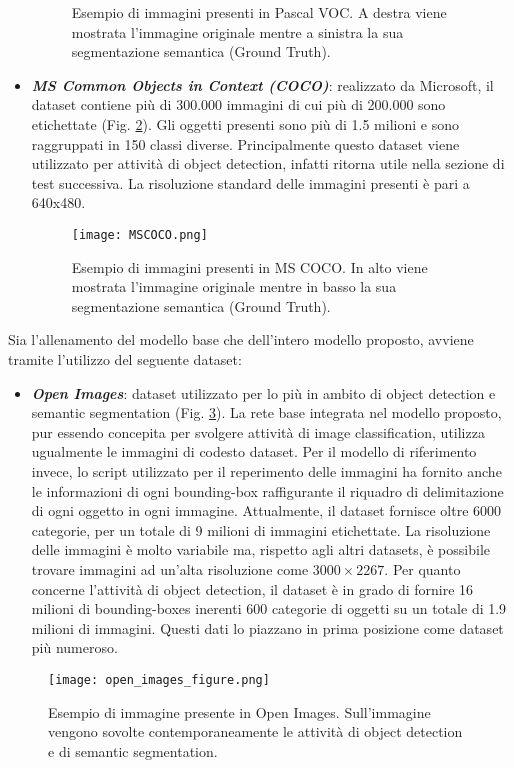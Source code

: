 \begin{itemize}
\begin{figure}
        \caption{Esempio di immagini presenti in Pascal VOC. A destra viene mostrata l'immagine originale mentre a sinistra la sua segmentazione semantica (Ground Truth).}
        \label{pascal}
    \end{figure} 
    \item {\bfseries{\emph{MS Common Objects in Context (COCO)}}}\cite{COCO}: realizzato da 
    Microsoft, il dataset contiene più di 300.000 immagini di cui più di 
    200.000 sono etichettate (Fig. \ref{MSCOCO_dataset}). Gli oggetti presenti sono più di 
    1.5 milioni e sono raggruppati in 150 classi diverse. Principalmente 
    questo dataset viene utilizzato per attività di object detection, infatti 
    ritorna utile nella sezione di test successiva. La risoluzione standard 
    delle immagini presenti è pari a 640x480.
    \begin{figure}
        \centering
        \texttt{[image: MSCOCO.png]}
        \centering
        \caption{Esempio di immagini presenti in MS COCO. In alto viene mostrata l'immagine originale mentre in basso la sua segmentazione semantica (Ground Truth).}
        \label{MSCOCO_dataset}
    \end{figure} 
\end{itemize}
Sia l'allenamento del modello base che dell'intero modello proposto, avviene 
tramite l'utilizzo del seguente dataset:
\begin{itemize}
    \item {\bfseries{\emph{Open Images}}}\cite{OpenImages2}: dataset utilizzato per lo più in ambito di object 
    detection e semantic segmentation (Fig. \ref{openimages_dataset}). La rete base integrata 
    nel modello proposto, pur essendo concepita per svolgere attività 
    di image classification, utilizza ugualmente le immagini di codesto 
    dataset. Per il modello di riferimento invece, lo script utilizzato per il 
    reperimento delle immagini ha fornito anche le informazioni di ogni 
    bounding-box raffigurante il riquadro di delimitazione di ogni oggetto 
    in ogni immagine. Attualmente, il dataset fornisce oltre 6000 categorie, 
    per un totale di 9 milioni di immagini etichettate. La risoluzione delle 
    immagini è molto variabile ma, rispetto agli altri datasets, è possibile 
    trovare immagini ad un'alta risoluzione come $3000\times{2267}$. Per quanto 
    concerne l'attività di object detection, il dataset è in grado di fornire 
    16 milioni di bounding-boxes inerenti 600 categorie di oggetti su un 
    totale di 1.9 milioni di immagini. Questi dati lo piazzano in prima 
    posizione come dataset più numeroso. 
\end{itemize}
\begin{figure}
    \centering
    \texttt{[image: open\_images\_figure.png]}
    \centering
    \caption{Esempio di immagine presente in Open Images. Sull'immagine vengono sovolte contemporaneamente le attività di object detection e di semantic segmentation.}
    \label{openimages_dataset}
\end{figure}


